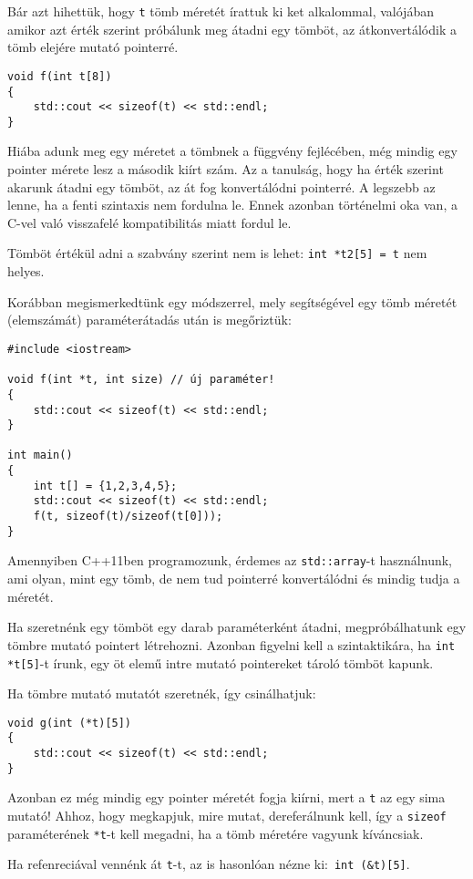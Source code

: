 \documentclass[../cpp_book/cpp_book.tex]{subfiles}
\begin{document}
	Bár azt hihettük, hogy \texttt{t} tömb méretét írattuk ki ket alkalommal, valójában amikor azt érték szerint próbálunk meg átadni egy tömböt, az átkonvertálódik a tömb elejére mutató pointerré.
	\begin{lstlisting}
void f(int t[8])
{
	std::cout << sizeof(t) << std::endl;
}
	\end{lstlisting}
	Hiába adunk meg egy méretet a tömbnek a függvény fejlécében, még mindig egy pointer mérete lesz a második kiírt szám. Az a tanulság, hogy ha érték szerint akarunk átadni egy tömböt, az át fog konvertálódni pointerré. A legszebb az lenne, ha a fenti szintaxis nem fordulna le. Ennek azonban történelmi oka van, a C-vel való visszafelé kompatibilitás miatt fordul le. 
	\begin{note}
		Tömböt értékül adni a szabvány szerint nem is lehet: \texttt{int *t2[5] = t} nem helyes.
	\end{note}
	Korábban megismerkedtünk egy módszerrel, mely segítségével egy tömb méretét (elemszámát) paraméterátadás után is megőriztük:
	\begin{lstlisting}
#include <iostream>

void f(int *t, int size) // új paraméter!
{
	std::cout << sizeof(t) << std::endl;
}

int main()
{
	int t[] = {1,2,3,4,5};
	std::cout << sizeof(t) << std::endl;
	f(t, sizeof(t)/sizeof(t[0]));
}
	\end{lstlisting}
	\begin{note}
		Amennyiben C++11ben programozunk, érdemes az \texttt{std::array}-t használnunk, ami olyan, mint egy tömb, de nem tud pointerré konvertálódni és mindig tudja a méretét.
	\end{note}
	Ha szeretnénk egy tömböt egy darab paraméterként átadni, megpróbálhatunk egy tömbre mutató pointert létrehozni. Azonban figyelni kell a szintaktikára, ha \texttt{int *t[5]}-t írunk, egy öt elemű intre mutató pointereket tároló tömböt kapunk.
	
	\medskip
	Ha tömbre mutató mutatót szeretnék, így csinálhatjuk:
	\begin{lstlisting}
void g(int (*t)[5])
{
	std::cout << sizeof(t) << std::endl;
}
	\end{lstlisting}
	Azonban ez még mindig egy pointer méretét fogja kiírni, mert a \texttt{t} az egy sima mutató! Ahhoz, hogy megkapjuk, mire mutat, dereferálnunk kell, így a \texttt{sizeof} paraméterének \texttt{*t}-t kell megadni, ha a tömb méretére vagyunk kíváncsiak.
	\begin{note}
		Ha refenreciával vennénk át \texttt{t}-t, az is hasonlóan nézne ki:\, \texttt{int (\&t)[5]}.
	\end{note}
	\medskip
	
\end{document}
